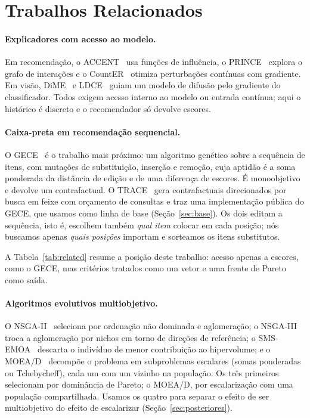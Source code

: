 \section{Trabalhos Relacionados}

\paragraph{Explicadores com acesso ao modelo.}
Em recomendação, o ACCENT~\cite{tran2021accent} usa funções de influência, o
PRINCE~\cite{ghazimatin2020prince} explora o grafo de interações e o
CountER~\cite{tan2021counter} otimiza perturbações contínuas com gradiente. Em
visão, DiME~\cite{jeanneret2022dime} e LDCE~\cite{schrodi2024ldce} guiam um
modelo de difusão pelo gradiente do classificador. Todos exigem acesso interno
ao modelo ou entrada contínua; aqui o histórico é discreto e o recomendador só
devolve escores.

\paragraph{Caixa-preta em recomendação sequencial.}
O GECE~\cite{scarcelli2025gece} é o trabalho mais próximo: um algoritmo
genético sobre a sequência de itens, com mutações de substituição, inserção e
remoção, cuja aptidão é a soma ponderada da distância de edição e de uma
diferença de escores. É monoobjetivo e devolve um contrafactual. O
TRACE~\cite{kim2026trace} gera contrafactuais direcionados por busca em feixe
com orçamento de consultas e traz uma implementação pública do GECE, que usamos
como linha de base (Seção~\ref{sec:base}). Os dois editam a sequência, isto é,
escolhem também \emph{qual item} colocar em cada posição; nós buscamos apenas
\emph{quais posições} importam e sorteamos os itens substitutos.

A Tabela~\ref{tab:related} resume a posição deste trabalho: acesso apenas a
escores, como o GECE, mas critérios tratados como um vetor e uma frente de
Pareto como saída.

\paragraph{Algoritmos evolutivos multiobjetivo.}
O NSGA-II~\cite{deb2002nsga2} seleciona por ordenação não dominada e
aglomeração; o NSGA-III~\cite{deb2014nsga3} troca a aglomeração por nichos em
torno de direções de referência; o SMS-EMOA~\cite{beume2007smsemoa} descarta o
indivíduo de menor contribuição ao hipervolume; e o MOEA/D~\cite{zhang2007moead}
decompõe o problema em subproblemas escalares (somas ponderadas ou
Tchebycheff), cada um com um vizinho na população. Os três primeiros selecionam
por dominância de Pareto; o MOEA/D, por escalarização com uma população
compartilhada. Usamos os quatro para separar o efeito de ser multiobjetivo do
efeito de escalarizar (Seção~\ref{sec:posteriores}).


